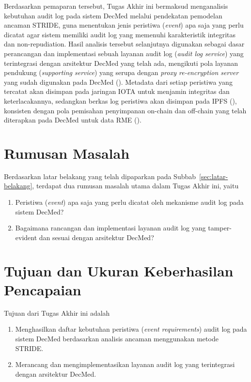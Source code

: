 Berdasarkan pemaparan tersebut, Tugas Akhir ini bermaksud menganalisis kebutuhan audit log pada sistem DecMed melalui pendekatan pemodelan ancaman STRIDE, guna menentukan jenis peristiwa (\textit{event}) apa saja yang perlu dicatat agar sistem memiliki audit log yang memenuhi karakteristik integritas dan non-repudiation. Hasil analisis tersebut selanjutnya digunakan sebagai dasar perancangan dan implementasi sebuah layanan audit log (\textit{audit log service}) yang terintegrasi dengan arsitektur DecMed yang telah ada, mengikuti pola layanan pendukung (\textit{supporting service}) yang serupa dengan \textit{proxy re-encryption server} yang sudah digunakan pada DecMed (\cite{DecMed}). Metadata dari setiap peristiwa yang tercatat akan disimpan pada jaringan IOTA untuk menjamin integritas dan keterlacakannya, sedangkan berkas log peristiwa akan disimpan pada IPFS (\cite{benet2014ipfscontentaddressed}), konsisten dengan pola pemisahan penyimpanan on-chain dan off-chain yang telah diterapkan pada DecMed untuk data RME (\cite{DecMed}).

\section{Rumusan Masalah}
\label{sec:rumusan-masalah}

Berdasarkan latar belakang yang telah dipaparkan pada Subbab~\ref{sec:latar-belakang}, terdapat dua rumusan masalah utama dalam Tugas Akhir ini, yaitu

\begin{enumerate}
\item Peristiwa (\textit{event}) apa saja yang perlu dicatat oleh mekanisme audit log pada sistem DecMed?
\item Bagaimana rancangan dan implementasi layanan audit log yang tamper-evident dan sesuai dengan arsitektur DecMed?
\end{enumerate}

\section{Tujuan dan Ukuran Keberhasilan Pencapaian}
\label{sec:tujuan}

Tujuan dari Tugas Akhir ini adalah

\begin{enumerate}
\item Menghasilkan daftar kebutuhan peristiwa (\textit{event requirements}) audit log pada sistem DecMed berdasarkan analisis ancaman menggunakan metode STRIDE.
\item Merancang dan mengimplementasikan layanan audit log yang terintegrasi dengan arsitektur DecMed.
\end{enumerate}

